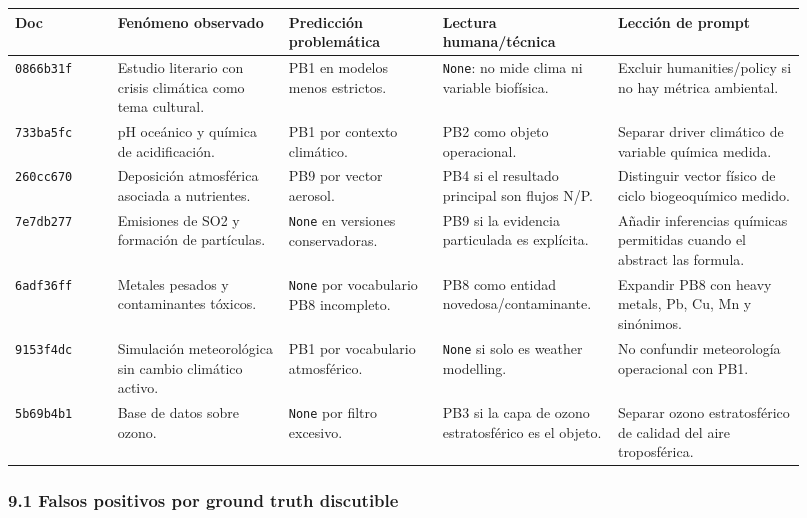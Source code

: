 \begin{center}
\scriptsize
\setlength{\tabcolsep}{3pt}
\renewcommand{\arraystretch}{1.15}
\begin{tabular}{p{0.12\linewidth}p{0.20\linewidth}p{0.18\linewidth}p{0.20\linewidth}p{0.22\linewidth}}
\toprule
Doc & Fenómeno observado & Predicción problemática & Lectura humana/técnica & Lección de prompt \\
\midrule
\texttt{0866b31f} & Estudio literario con crisis climática como tema cultural. & PB1 en modelos menos estrictos. & \texttt{None}: no mide clima ni variable biofísica. & Excluir humanities/policy si no hay métrica ambiental. \\
\texttt{733ba5fc} & pH oceánico y química de acidificación. & PB1 por contexto climático. & PB2 como objeto operacional. & Separar driver climático de variable química medida. \\
\texttt{260cc670} & Deposición atmosférica asociada a nutrientes. & PB9 por vector aerosol. & PB4 si el resultado principal son flujos N/P. & Distinguir vector físico de ciclo biogeoquímico medido. \\
\texttt{7e7db277} & Emisiones de SO2 y formación de partículas. & \texttt{None} en versiones conservadoras. & PB9 si la evidencia particulada es explícita. & Añadir inferencias químicas permitidas cuando el abstract las formula. \\
\texttt{6adf36ff} & Metales pesados y contaminantes tóxicos. & \texttt{None} por vocabulario PB8 incompleto. & PB8 como entidad novedosa/contaminante. & Expandir PB8 con heavy metals, Pb, Cu, Mn y sinónimos. \\
\texttt{9153f4dc} & Simulación meteorológica sin cambio climático activo. & PB1 por vocabulario atmosférico. & \texttt{None} si solo es weather modelling. & No confundir meteorología operacional con PB1. \\
\texttt{5b69b4b1} & Base de datos sobre ozono. & \texttt{None} por filtro excesivo. & PB3 si la capa de ozono estratosférico es el objeto. & Separar ozono estratosférico de calidad del aire troposférica. \\
\bottomrule
\end{tabular}
\end{center}

\subsubsection{9.1 Falsos positivos por ground truth discutible}

